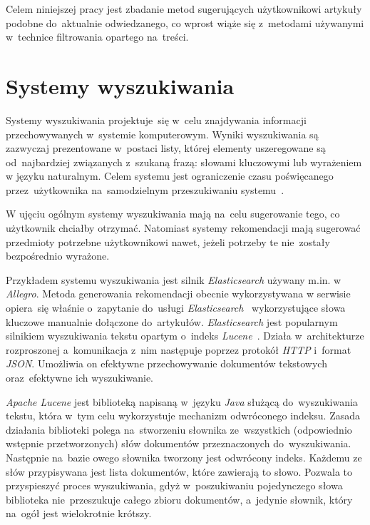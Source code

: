 \documentclass[pl]{minipw} %
\begin{document}
Celem niniejszej pracy jest zbadanie metod sugerujących użytkownikowi artykuły podobne do~aktualnie odwiedzanego, co wprost wiąże się z~metodami używanymi w~technice filtrowania opartego na~treści.

\section{Systemy wyszukiwania}

Systemy wyszukiwania projektuje~się w~celu znajdywania informacji przechowywanych w~systemie komputerowym. Wyniki wyszukiwania są zazwyczaj prezentowane w~postaci listy, której elementy uszeregowane są od~najbardziej związanych z~szukaną frazą: słowami kluczowymi lub wyrażeniem w języku naturalnym. Celem systemu jest ograniczenie czasu poświęcanego przez~użytkownika na~samodzielnym przeszukiwaniu systemu~\cite{engines}.

W ujęciu ogólnym systemy wyszukiwania mają na~celu sugerowanie tego, co użytkownik chciałby otrzymać. Natomiast systemy rekomendacji mają sugerować przedmioty potrzebne użytkownikowi nawet, jeżeli potrzeby te nie~zostały bezpośrednio wyrażone.

Przykładem systemu wyszukiwania jest silnik \textit{Elasticsearch} używany m.in. w \textit{Allegro}. Metoda generowania rekomendacji obecnie wykorzystywana w serwisie opiera~się właśnie o~zapytanie do~usługi \textit{Elasticsearch}~\cite{elastic} wykorzystujące słowa kluczowe manualnie dołączone do~artykułów. \textit{Elasticsearch} jest popularnym silnikiem wyszukiwania tekstu opartym o~indeks \textit{Lucene}~\cite{lucene}. Działa w~architekturze rozproszonej a~komunikacja z~nim następuje poprzez protokół \textit{HTTP} i~format \textit{JSON}. Umożliwia on efektywne przechowywanie dokumentów tekstowych oraz~efektywne ich wyszukiwanie.

\textit{Apache Lucene} jest biblioteką napisaną w~języku \textit{Java} służącą do~wyszukiwania tekstu, która w~tym celu wykorzystuje mechanizm odwróconego indeksu. Zasada działania biblioteki polega na~stworzeniu słownika ze~wszystkich (odpowiednio wstępnie przetworzonych) słów dokumentów przeznaczonych do~wyszukiwania. Następnie na~bazie owego słownika tworzony jest odwrócony indeks. Każdemu ze słów przypisywana jest lista dokumentów, które zawierają to słowo. Pozwala to przyspieszyć proces wyszukiwania, gdyż w~poszukiwaniu pojedynczego słowa biblioteka nie~przeszukuje całego zbioru dokumentów, a~jedynie słownik, który na~ogół jest wielokrotnie krótszy.
\end{document}

